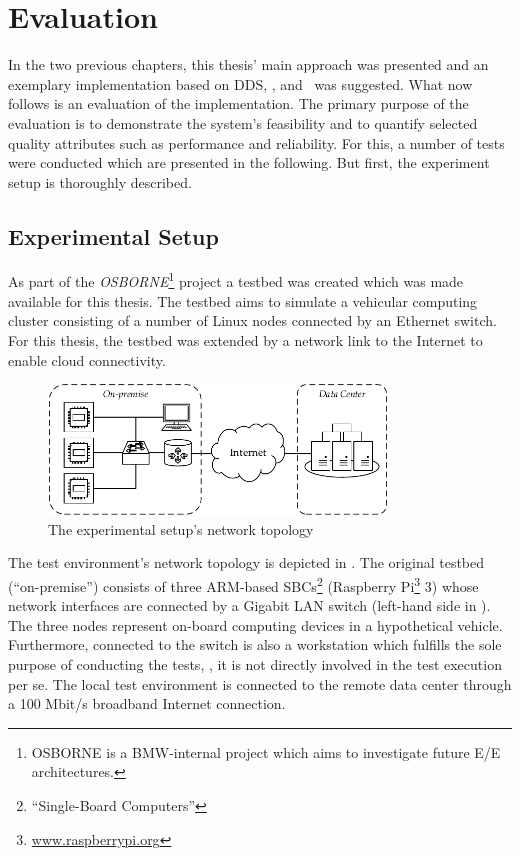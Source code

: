 \chapter{Evaluation}\label{chapter:evaluation}
In the two previous chapters, this thesis' main approach was presented and an exemplary implementation based on DDS, \wnet , and \docker\ was suggested. What now follows is an evaluation of the implementation. The primary purpose of the evaluation is to demonstrate the system's feasibility and to quantify selected quality attributes such as performance and reliability. For this, a number of tests were conducted which are presented in the following. But first, the experiment setup is thoroughly described.


\section{Experimental Setup}\label{sec:testsetup}

As part of the \emph{OSBORNE}\footnote{OSBORNE is a BMW-internal project which aims to investigate future E/E architectures.} project a testbed was created which was made available for this thesis. The testbed aims to simulate a vehicular computing cluster consisting of a number of Linux nodes connected by an Ethernet switch. For this thesis, the testbed was extended by a network link to the Internet to enable cloud connectivity.

\begin{figure}[htpb]
  \centering
  \includegraphics[width=0.8\textwidth]{figures/network-setup}
  \caption[Network topology of the experimental setup]{The experimental setup's network topology}\label{fig:network-topology}
\end{figure}
The test environment's network topology is depicted in . The original testbed (``on-premise'') consists of three ARM-based SBCs\footnote{``Single-Board Computers''} (Raspberry Pi\footnote{\url{www.raspberrypi.org}} 3) whose network interfaces are connected by a Gigabit LAN switch (left-hand side in ). The three nodes represent on-board computing devices in a hypothetical vehicle. Furthermore, connected to the switch is also a workstation which fulfills the sole purpose of conducting the tests, \ie , it is not directly involved in the test execution per se. The local test environment is connected to the remote data center through a 100 Mbit/s broadband Internet connection.

